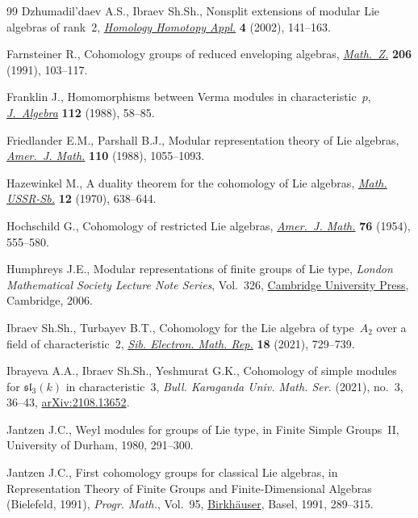 \documentclass[pdftex]{sigma}%
\numberwithin{equation}{section}
\begin{document}
\begin{thebibliography}{99}
Dzhumadil'daev A.S., Ibraev Sh.Sh., Nonsplit extensions of modular {L}ie algebras
 of rank~2, \href{https://doi.org/10.4310/hha.2002.v4.n2.a7}{\textit{Homology Homotopy Appl.}} \textbf{4} (2002), 141--163.

Farnsteiner R., Cohomology groups of reduced enveloping algebras,
 \href{https://doi.org/10.1007/BF02571329}{\textit{Math.~Z.}} \textbf{206} (1991), 103--117.

Franklin J., Homomorphisms between {V}erma modules in characteristic~{$p$},
 \href{https://doi.org/10.1016/0021-8693(88)90132-9}{\textit{J.~Algebra}} \textbf{112} (1988), 58--85.

Friedlander E.M., Parshall B.J., Modular representation theory of {L}ie
 algebras, \href{https://doi.org/10.2307/2374686}{\textit{Amer.~J. Math.}} \textbf{110} (1988), 1055--1093.

Hazewinkel M., A duality theorem for the cohomology of Lie algebras,
 \href{https://doi.org/10.1070/SM1970v012n04ABEH000942}{\textit{Math. USSR-Sb.}} \textbf{12} (1970), 638--644.

Hochschild G., Cohomology of restricted {L}ie algebras, \href{https://doi.org/10.2307/2372701}{\textit{Amer.~J. Math.}}
 \textbf{76} (1954), 555--580.

Humphreys J.E., Modular representations of finite groups of {L}ie type,
 \textit{London Mathematical Society Lecture Note Series}, Vol.~326, \href{https://doi.org/10.1017/CBO9780511525940}{Cambridge
 University Press}, Cambridge, 2006.

Ibraev Sh.Sh., Turbayev B.T., Cohomology for the {L}ie algebra of type~{$A_2$}
 over a field of characteristic~2, \href{https://doi.org/10.33048/semi.2021.18.053}{\textit{Sib. Electron. Math. Rep.}}
 \textbf{18} (2021), 729--739.

Ibrayeva A.A., Ibraev Sh.Sh., Yeshmurat G.K., Cohomology of simple modules for
 $\mathfrak{sl}_3(k)$ in characteristic~$3$, \textit{Bull. Karaganda Univ. Math. Ser.} (2021), no.~3, 36--43, \href{https://arxiv.org/abs/2108.13652}{arXiv:2108.13652}.

Jantzen J.C., Weyl modules for groups of {L}ie type, in Finite Simple
 Groups~{II}, University of Durham, 1980, 291--300.

Jantzen J.C., First cohomology groups for classical {L}ie algebras, in
 Representation Theory of Finite Groups and Finite-Dimensional Algebras
 ({B}ielefeld, 1991), \textit{Progr. Math.}, Vol.~95, \href{https://doi.org/10.1007/978-3-0348-8658-1_11}{Birkh\"auser}, Basel,
 1991, 289--315.


\end{thebibliography}
\end{document}
